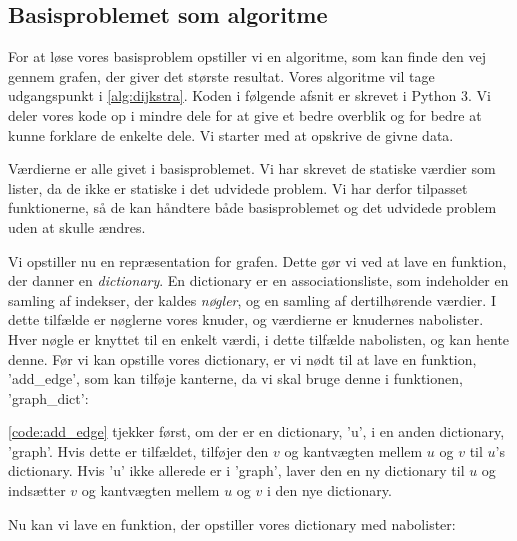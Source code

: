 \subsection{Basisproblemet som algoritme}
For at løse vores basisproblem opstiller vi en algoritme, som kan finde den vej gennem grafen, der giver det største resultat. Vores algoritme vil tage udgangspunkt i \autoref{alg:dijkstra}. Koden i følgende afsnit er skrevet i Python 3. Vi deler vores kode op i mindre dele for at give et bedre overblik og for bedre at kunne forklare de enkelte dele. Vi starter med at opskrive de givne data. 



Værdierne er alle givet i basisproblemet. Vi har skrevet de statiske værdier som lister, da de ikke er statiske i det udvidede problem. Vi har derfor tilpasset funktionerne, så de kan håndtere både basisproblemet og det udvidede problem uden at skulle ændres. 

Vi opstiller nu en repræsentation for grafen. Dette gør vi ved at lave en funktion, der danner en \emph{dictionary}. En dictionary er en associationsliste, som indeholder en samling af indekser, der kaldes \emph{nøgler}, og en samling af dertilhørende værdier. I dette tilfælde er nøglerne vores knuder, og
værdierne er knudernes nabolister. Hver nøgle er knyttet til en enkelt værdi, i dette tilfælde nabolisten, og kan hente denne. Før vi kan opstille vores dictionary, er vi nødt til at lave en funktion, 'add\_edge', som kan tilføje kanterne, da vi skal bruge denne i funktionen, 'graph\_dict':



\autoref{code:add_edge} tjekker først, om der er en dictionary, 'u', i en anden dictionary, 'graph'. Hvis dette er tilfældet, tilføjer den $v$ og kantvægten mellem $u$ og $v$ til  $u$'s dictionary. Hvis 'u' ikke allerede er i 'graph', laver den en ny dictionary til $u$ og indsætter $v$ og kantvægten mellem $u$ og $v$ i den nye dictionary.

Nu kan vi lave en funktion, der opstiller vores dictionary med nabolister:



